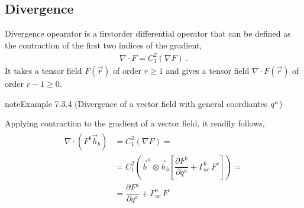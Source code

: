 \documentclass[letterpaper,10pt,english]{jupyterBook}
\begin{document}
\subsection{Divergence}
\label{\detokenize{ch/tensor-algebra-calculus/calculus-euclidean:divergence}}\label{\detokenize{ch/tensor-algebra-calculus/calculus-euclidean:tensor-calculus-differential-operators-divergence}}
\sphinxAtStartPar
Divergence opearator is a first\sphinxhyphen{}order differential operator that can be defined as the contraction of the first two indices of the gradient,
\begin{equation*}
\begin{split}\nabla \cdot F = C_{1}^{2}\left( \nabla F \right) \ .\end{split}
\end{equation*}
\sphinxAtStartPar
It takes a tensor field \(F(\vec{r})\) of order \(r \ge 1\) and gives a tensor field \(\nabla \cdot F(\vec{r})\) of order \(r-1 \ge 0\).
\label{ch/tensor-algebra-calculus/calculus-euclidean:example-7}
\begin{sphinxadmonition}{note}{Example 7.3.4 (Divergence of a vector field \sphinxhyphen{} with general coordiantes \protect\(q^{a}\protect\))}



\sphinxAtStartPar
Applying contraction to the gradient of a vector field, it readily follows,
\begin{equation*}
\begin{split}\begin{aligned}
  \nabla \cdot \left( F^b \vec{b}_b \right)
  & = C_{1}^{2} \left( \nabla F \right) = \\
  & = C_1^2 \left( \vec{b}^a \otimes \vec{b}_b \left[ \dfrac{\partial F^b}{\partial q^a} + \Gamma_{ac}^b \, F^c \right] \right) = \\
  & = \dfrac{\partial F^a}{\partial q^a} + \Gamma_{ac}^a \, F^c
\end{aligned}\end{split}
\end{equation*}\end{sphinxadmonition}
\label{ch/tensor-algebra-calculus/calculus-euclidean:example-8}
\end{document}
